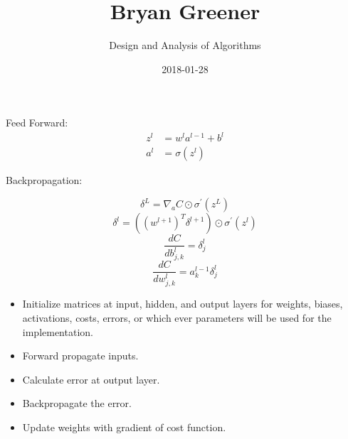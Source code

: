 \documentclass[12pt]{article}
\title{Bryan Greener}
\author{Design and Analysis of Algorithms}
\date{2018-01-28}
\begin{document}
\maketitle

\TabPositions{4cm}

Feed Forward:\\
\begin{align*}
z^l &= w^la^{l-1}+b^l\\
a^l &= \sigma(z^l)
\end{align*}

Backpropagation:

\[ \delta^L = \nabla_aC\odot \sigma^{\prime}(z^L) \]
\[ \delta^l = ((w^{l+1})^T\delta^{l+1})\odot\sigma^\prime(z^l) \]
\[ \dfrac{dC}{db_{j,k}^l} = \delta_j^l \]
\[ \dfrac{dC}{dw_{j,k}^l} = a^{l-1}_k\delta_j^l \]



\begin{itemize}
\item Initialize matrices at input, hidden, and output layers for weights, biases, activations, costs, errors, or which ever parameters will be used for the implementation.
\item Forward propagate inputs.
\item Calculate error at output layer.
\item Backpropagate the error.
\item Update weights with gradient of cost function.
\end{itemize}
\end{document}
